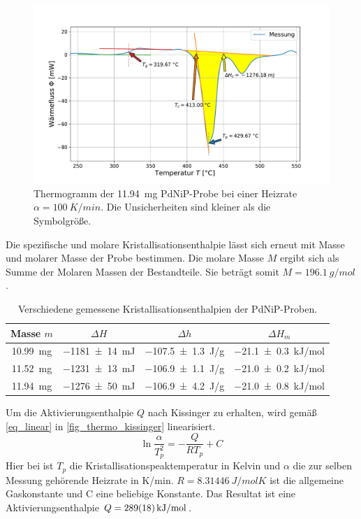 \documentclass[
	a4paper,
	12pt,
	pagesize,
	ngerman
]{scrartcl}
\begin{document}
	\begin{figure}[H]
			\includegraphics[width=\linewidth]{img/Kalorimetrie_pdnip_100.pdf}
			\caption{
				Thermogramm der \SI{11.94}{mg} PdNiP-Probe bei einer Heizrate $\alpha = \SI{100}{K/min}$.
			Die Unsicherheiten sind kleiner als die Symbolgröße.
			}
			\label{fig_themo_pdnip_100}
	\end{figure}
	Die spezifische und molare Kristallisationsenthalpie lässt sich erneut mit Masse und molarer Masse der Probe bestimmen.
	Die molare Masse $M$ ergibt sich als Summe der Molaren Massen der Bestandteile.
	Sie beträgt somit $M=\SI{196.1}{g/mol}$. %
\begin{table}[H]
		\centering
		\begin{tabular}{c | c | c | c  }
			 Masse $m$ &$\Delta H$& $\Delta h$  &$\Delta H_m$ \\ \hline
			 \SI{10.99}{mg}& \SI{-1181+-14}{mJ}&\SI{-107.5+-1.3}{J/g}& \SI{-21.1+-0.3}{kJ/mol} \\
			 \SI{11.52}{mg}& \SI{-1231+-13}{mJ}&\SI{-106.9+-1.1}{J/g}& \SI{-21.0+-0.2}{kJ/mol} \\
			 \SI{11.94}{mg}& \SI{-1276+-50}{mJ}&\SI{-106.9+-4.2}{J/g}& \SI{-21.0+-0.8}{kJ/mol} \\
		\end{tabular}
		\caption{
		Verschiedene gemessene Kristallisationsenthalpien der PdNiP-Proben.
		}
		\label{tb_enthal_pdnip}
\end{table}

	Um die Aktivierungsenthalpie $Q$ nach Kissinger zu erhalten, wird gemäß \cref{eq_linear} in \cref{fig_thermo_kissinger} linearisiert.
	\begin{equation}
		\label{eq_linear}
			\ln{\frac{\alpha}{T_p^2}} = -\frac{Q}{RT_p} + C
	\end{equation}
	Hier bei ist $T_p$ die Kristallisationspeaktemperatur in Kelvin und $\alpha$ die zur selben Messung gehörende Heizrate in \si{K/min}.
	$R=\SI{8.31446}{J/molK}$ ist die allgemeine Gaskonstante und C eine beliebige Konstante.
	Das Resultat ist eine Aktivierungsenthalpie $Q=\SI{289+-18}{kJ/mol}$.
\end{document}
